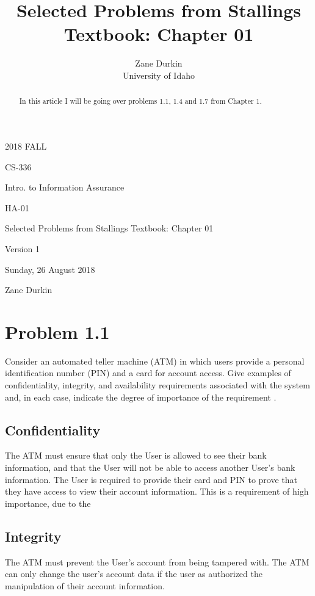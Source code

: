 \documentclass[14pt]{article}
\begin{document}
\title{Selected Problems from Stallings Textbook: Chapter 01}

\author{Zane Durkin\\
    University of Idaho}

\begin{description}[leftmargin=!, labelwidth=\widthof{\bfseries Author(s) Name(s)}]
\item [Year and Semester] 2018 FALL
\item [Course Number] CS-336
\item [Course Title] Intro. to Information Assurance
\item [Work Number] HA-01
\item [Work Name] Selected Problems from Stallings Textbook: Chapter 01
\item [Work Version] Version 1
\item [Long Date] Sunday, 26 August 2018
\item [Author(s) Name(s)] Zane Durkin
\end{description}


\begin{abstract}
In this article I will be going over problems 1.1, 1.4 and 1.7 from Chapter 1. 
\end{abstract}

\section{Problem 1.1}
Consider an automated teller machine (ATM) in which users provide a personal identification number (PIN) and a card for account access. Give examples of confidentiality, integrity, and availability requirements associated with the system and, in each case, indicate the degree of importance of the requirement \cite{stallings}.
\subsection{Confidentiality}
The ATM must ensure that only the User is allowed to see their bank information, and that the User will not be able to access another User's bank information. The User is required to provide their card and PIN to prove that they have access to view their account information. This is a requirement of high importance, due to the 
\subsection{Integrity}
The ATM must prevent the User's account from being tampered with. The ATM can only change the user's account data if the user as authorized the manipulation of their account information.
\end{document}

